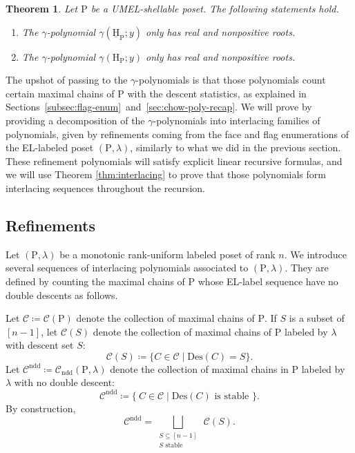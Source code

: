 \documentclass[11pt,a4paper]{amsart}
\theoremstyle{results}
\newtheorem{maintheorem}[thm]{Theorem}
\theoremstyle{definitions}
\def\P{\mathbb{P}}
\def\calC{\mathcal{C}}
\newcommand{\uH}{\underline{\mathrm{H}}}
\newcommand{\Des}{\mathrm{Des}}
\renewcommand{\P}{\mathrm{P}}
\renewcommand{\H}{\mathrm{H}}
\begin{document}
\begin{maintheorem}
\label{thm:gamma-RR-mono-rank-up-uniform}
    Let $\P$ be a UMEL-shellable poset. 
    The following statements hold.
    \begin{enumerate}[\normalfont(i)]
        \item The $\gamma$-polynomial $\gamma(\uH_{\P}; y)$ only has real and nonpositive roots. 
        \item The $\gamma$-polynomial $\gamma(\H_{\P}; y)$ only has real and nonpositive roots. 
    \end{enumerate}
\end{maintheorem}
The upshot of passing to the $\gamma$-polynomials is that those polynomials count certain maximal chains of $\P$ with the descent statistics, as explained in Sections~\ref{subsec:flag-enum}~and~\ref{sec:chow-poly-recap}. We will prove  by providing a decomposition of the $\gamma$-polynomials into interlacing families of polynomials, given by refinements coming from the face and flag enumerations of the EL-labeled poset $(\P, \lambda)$, similarly to what we did in the previous section. These refinement polynomials will satisfy explicit linear recursive formulas, and we will use Theorem \ref{thm:interlacing} to prove that those polynomials form interlacing sequences throughout the recursion. 
\subsection{Refinements} 
Let $(\P,\lambda)$ be a monotonic rank-uniform labeled poset of rank $n$. We introduce several sequences of interlacing polynomials associated to $(\P, \lambda)$. They are defined by counting the maximal chains of $\P$ whose EL-label sequence have no double descents as follows. 

Let $\calC \coloneq \calC(\P)$ denote the collection of maximal chains of $\P$. If $S$ is a subset of $[n-1]$, let $\calC(S)$ denote the collection of maximal chains of $\P$ labeled by $\lambda$ with descent set $S$: 
\[
\calC(S) \coloneqq \{ C \in \calC \mid \Des(C) = S\}. 
\]
Let $\calC^{\textrm{ndd}} \coloneqq \calC_{\textrm{ndd}}(\P, \lambda)$ denote the collection of maximal chains in $\P$ labeled by $\lambda$ with no double descent: 
\[
\calC^{\textrm{ndd}} \coloneq \{\: C \in \calC \mid \Des(C) \text{ is stable }\}.
\] 
By construction, 
\[
\calC^{\textrm{ndd}} =  \bigsqcup_{\substack{ S \subseteq [n-1] \\ S \text{ stable}}} \: \calC(S). 
\]  
\end{document}
